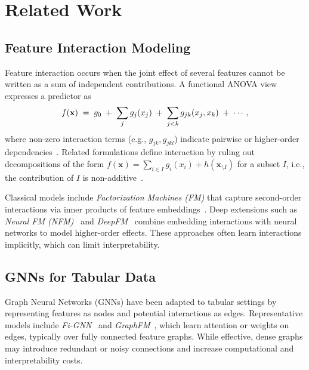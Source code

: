 \documentclass[10pt,a4paper]{article}
\begin{document}
\section{Related Work}\label{sec:related}
\subsection{Feature Interaction Modeling}
Feature interaction occurs when the joint effect of several features cannot be written as a sum of independent contributions. A functional ANOVA view expresses a predictor as
\begin{equation}
\small
f(\mathbf{x}) \;=\; g_0 \;+\; \sum_j g_j(x_j) \;+\; \sum_{j<k} g_{jk}(x_j,x_k) \;+\; \cdots,
\end{equation}
where non-zero interaction terms (e.g., $g_{jk}, g_{jkl}$) indicate pairwise or higher-order dependencies~\cite{herbinger2024decomposing}. Related formulations define interaction by ruling out decompositions of the form
$f(\mathbf{x})=\sum_{i\in I} g_i(x_i)+h(\mathbf{x}_{\setminus I})$ for a subset $I$, i.e., the contribution of $I$ is non-additive~\cite{tsang2020interaction,Tsang2020HowDT}.

Classical models include \emph{Factorization Machines (FM)} that capture second-order interactions via inner products of feature embeddings~\cite{FM}. Deep extensions such as \emph{Neural FM (NFM)}~\cite{He2017NeuralFM} and \emph{DeepFM}~\cite{DeepFM} combine embedding interactions with neural networks to model higher-order effects. These approaches often learn interactions implicitly, which can limit interpretability.

\subsection{GNNs for Tabular Data}
Graph Neural Networks (GNNs) have been adapted to tabular settings by representing features as nodes and potential interactions as edges. Representative models include \emph{Fi-GNN}~\cite{fignn} and \emph{GraphFM}~\cite{GraphFM}, which learn attention or weights on edges, typically over fully connected feature graphs. While effective, dense graphs may introduce redundant or noisy connections and increase computational and interpretability costs.
\end{document}
